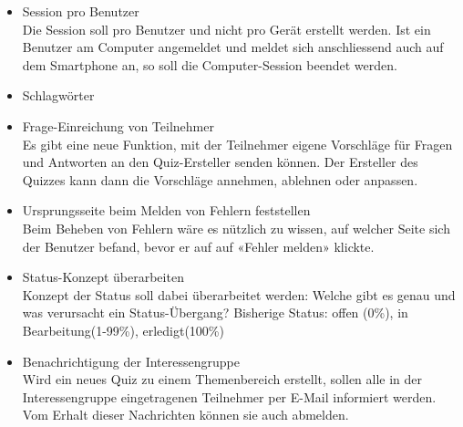 \begin{itemize}
	\item Session pro Benutzer \\
	Die Session soll pro Benutzer und nicht pro Gerät erstellt werden. Ist ein Benutzer am Computer angemeldet und meldet sich anschliessend auch auf dem Smartphone an, so soll die Computer-Session beendet werden.
	
	\item Schlagwörter \\
	
	\item Frage-Einreichung von Teilnehmer \\
	Es gibt eine neue Funktion, mit der Teilnehmer eigene Vorschläge für Fragen und Antworten an den Quiz-Ersteller senden können. Der Ersteller des Quizzes kann dann die Vorschläge annehmen, ablehnen oder anpassen.
	
	\item Ursprungsseite beim Melden von Fehlern feststellen \\
	Beim Beheben von Fehlern wäre es nützlich zu wissen, auf welcher Seite sich der Benutzer befand, bevor er auf auf «Fehler melden» klickte.
	
	\item Status-Konzept überarbeiten \\
	Konzept der Status soll dabei überarbeitet werden: Welche gibt es genau und was verursacht ein Status-Übergang?
	Bisherige Status: offen (0\%), in Bearbeitung(1-99\%), erledigt(100\%)
	
	\item Benachrichtigung der Interessengruppe\\
	Wird ein neues Quiz zu einem Themenbereich erstellt, sollen alle in der Interessengruppe eingetragenen Teilnehmer per E-Mail informiert werden. Vom Erhalt dieser Nachrichten können sie auch abmelden.
	
\end{itemize}


